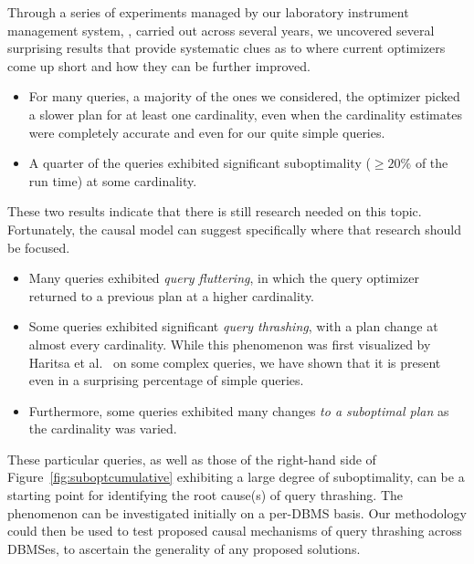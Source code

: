 \documentclass[prodmode,acmtods]{acmsmall}
\def\azdb{\doubleblind{\hbox{\sc AZDBLab}}{\hbox{\sc DBLab}}}
\begin{document}
Through a series of experiments managed by our laboratory instrument
management system, \azdb, carried out across several years, we uncovered
several surprising results that provide systematic clues as to where current optimizers come up
short and how they can be further improved.

\begin{itemize}
\item For many queries, a majority of the ones we
considered, the optimizer picked a slower plan for at least one
cardinality, even when the cardinality estimates were completely accurate
and even for our quite simple queries.

\item A quarter of the queries exhibited significant suboptimality ($\geq 20\%$ of
        the run time) at some cardinality.
\end{itemize}
\noindent
These two results indicate that there is still research needed on
this topic. Fortunately, the causal model can suggest
specifically where that research should be focused.

\begin{itemize}

\item Many queries exhibited {\em query fluttering}, in which the query
  optimizer returned to a previous plan at a higher cardinality.
\item Some queries exhibited significant {\em query thrashing}, with a plan change at
         almost every cardinality. While this phenomenon was first visualized
         by Haritsa et al.~\cite{harish07,Haritsa10} on some complex
         queries, we have shown that it is present even in a surprising
         percentage of simple queries.

\item Furthermore, some queries exhibited many changes
{\em to a suboptimal plan} as the \hbox{cardinality} was varied.
\end{itemize}
\noindent
These particular queries, as well as those of the right-hand side of
Figure~\ref{fig:suboptcumulative} exhibiting a large degree of suboptimality, can be a starting point for identifying the root
cause(s) of query thrashing. The phenomenon can be investigated initially on a
per-DBMS basis. Our methodology could then be
used to test proposed causal mechanisms of query thrashing across \hbox{DBMSes}, to
ascertain the generality of any proposed solutions.
\end{document}
